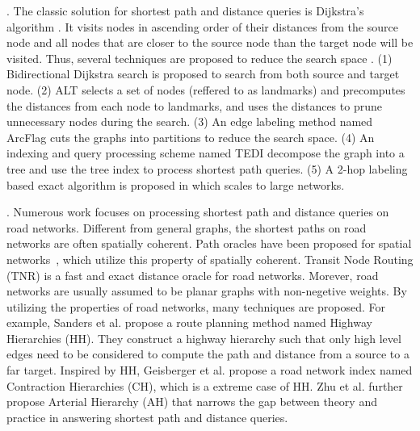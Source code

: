 .
The classic solution for shortest path and distance queries is Dijkstra's algorithm \cite{Dijkstra59}. It visits nodes in ascending order of their distances from the source node and all nodes that are closer to the source node than the target node will be visited. Thus, several techniques are proposed to reduce the search space \cite{LubyR89, GoldbergH05}. (1) Bidirectional Dijkstra search \cite{LubyR89} is proposed to search from both source and target node. (2) ALT \cite{GoldbergH05} selects a set of nodes (reffered to as landmarks) and precomputes the distances from each node to landmarks, and uses the distances to prune unnecessary nodes during the search. (3) An edge labeling method named ArcFlag \cite{MohringSSWW05} cuts the graphs into partitions to reduce the search space.
(4) An indexing and query processing scheme named TEDI\cite{Wei10} decompose the graph into a tree and use the tree index to process shortest path queries. (5) A 2-hop labeling based exact algorithm is proposed in \cite{delling2014robust} which scales to large networks.





.
Numerous work focuses on processing shortest path and distance queries on road networks. Different from general graphs, the shortest paths on road networks are often spatially coherent. Path oracles have been proposed for spatial networks~\cite{SankaranarayananSA09}, which utilize this property of spatially coherent. Transit Node Routing (TNR)\cite{arz2013transit} is a fast and exact distance oracle for road networks. Morever, road networks are usually assumed to be planar graphs with non-negetive weights\cite{fakcharoenphol2006planar,gupta2004roads,klein2010shortest,MozesS12}. By utilizing the properties of road networks, many techniques\cite{SandersS05, GeisbergerSSD08, zhu2013shortest} are proposed. For example, Sanders et al. propose a route planning method named Highway Hierarchies (HH)\cite{SandersS05}. They construct a highway hierarchy such that only high level edges need to be considered to compute the path and distance from a source to a far target. Inspired by HH, Geisberger et al.\cite{GeisbergerSSD08} propose a road network index named Contraction Hierarchies (CH), which is a extreme case of HH. Zhu et al. further propose Arterial Hierarchy (AH)\cite{zhu2013shortest} that narrows the gap between theory and practice in answering shortest path and distance queries.

